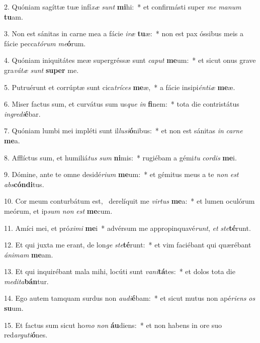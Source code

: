 2. Quóniam sagíttæ tuæ infí\textit{xæ} \textit{sunt} \textbf{mi}hi:~*  et confirmásti super \textit{me} \textit{ma}\textit{num} \textbf{tu}am.\

3. Non est sánitas in carne mea a fácie \textit{i}\textit{ræ} \textbf{tu}æ:~*  non est pax óssibus meis a fácie pecca\textit{tó}\textit{rum} \textit{me}\textbf{ó}rum.\

4. Quóniam iniquitátes meæ supergréssæ sunt \textit{ca}\textit{put} \textbf{me}um:~*  et sicut onus grave gra\textit{vá}\textit{tæ} \textit{sunt} \textbf{su}\textbf{per} me.\

5. Putruérunt et corrúptæ sunt cica\textit{trí}\textit{ces} \textbf{me}æ,~*  a fácie insipi\textit{én}\textit{ti}\textit{æ} \textbf{me}æ.\

6. Miser factus sum, et curvátus sum us\textit{que} \textit{in} \textbf{fi}nem:~*  tota die contristátus \textit{in}\textit{gre}\textit{di}\textbf{é}bar.\

7. Quóniam lumbi mei impléti sunt il\textit{lu}\textit{si}\textbf{ó}nibus:~*  et non est sánitas \textit{in} \textit{car}\textit{ne} \textbf{me}a.\

8. Afflíctus sum, et humiliá\textit{tus} \textit{sum} \textbf{ni}mis:~*  rugiébam a gémi\textit{tu} \textit{cor}\textit{dis} \textbf{me}i.\

9. Dómine, ante te omne desidé\textit{ri}\textit{um} \textbf{me}um:~*  et gémitus meus a te \textit{non} \textit{est} \textit{abs}\textbf{cón}\textbf{di}tus.\

10. Cor meum conturbátum est, \dag\  derelíquit me \textit{vir}\textit{tus} \textbf{me}a:~*  et lumen oculórum meórum, et ip\textit{sum} \textit{non} \textit{est} \textbf{me}cum.\

11. Amíci mei, et pró\textit{xi}\textit{mi} \textbf{me}i~*  advérsum me appropinquavé\textit{runt}, \textit{et} \textit{ste}\textbf{té}runt.\

12. Et qui juxta me erant, de lon\textit{ge} \textit{ste}\textbf{té}runt:~*  et vim faciébant qui quærébant \textit{á}\textit{ni}\textit{mam} \textbf{me}am.\

13. Et qui inquirébant mala mihi, locúti sunt \textit{va}\textit{ni}\textbf{tá}tes:~*  et dolos tota die \textit{me}\textit{di}\textit{ta}\textbf{bán}tur.\

14. Ego autem tamquam surdus non \textit{au}\textit{di}\textbf{é}bam:~*  et sicut mutus non apé\textit{ri}\textit{ens} \textit{os} \textbf{su}um.\

15. Et factus sum sicut ho\textit{mo} \textit{non} \textbf{áu}diens:~*  et non habens in ore suo red\textit{ar}\textit{gu}\textit{ti}\textbf{ó}nes.\

